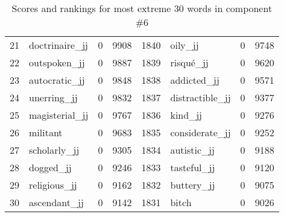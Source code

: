 \begin{table}[tbp]
\begin{tabular}{| rlr@{.}l | rlr@{.}l |}
    21 & doctrinaire\_jj & 0 & 9908    &    1840 & oily\_jj & 0 & 9748 \\
    22 & outspoken\_jj & 0 & 9887    &    1839 & risqué\_jj & 0 & 9620 \\
    23 & autocratic\_jj & 0 & 9848    &    1838 & addicted\_jj & 0 & 9571 \\
    24 & unerring\_jj & 0 & 9832    &    1837 & distractible\_jj & 0 & 9377 \\
    25 & magisterial\_jj & 0 & 9767    &    1836 & kind\_jj & 0 & 9276 \\
    26 & militant & 0 & 9683    &    1835 & considerate\_jj & 0 & 9252 \\
    27 & scholarly\_jj & 0 & 9305    &    1834 & autistic\_jj & 0 & 9188 \\
    28 & dogged\_jj & 0 & 9246    &    1833 & tasteful\_jj & 0 & 9120 \\
    29 & religious\_jj & 0 & 9162    &    1832 & buttery\_jj & 0 & 9075 \\
    30 & ascendant\_jj & 0 & 9142    &    1831 & bitch & 0 & 9026 \\
    \hline
    \end{tabular}
    \caption{Scores and rankings for most extreme 30 words in component \#6} 
\end{table}
\clearpage
